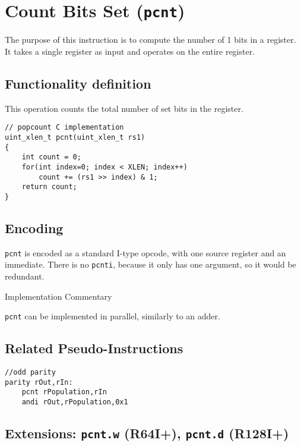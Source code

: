 
\section{Count Bits Set (\texttt{pcnt})}

The purpose of this instruction is to compute the number of 1 bits in a
register. It takes a single register as input and operates on the entire
register.

\subsection{Functionality definition}

This operation counts the total number of set bits in the register.

\begin{verbatim}
// popcount C implementation
uint_xlen_t pcnt(uint_xlen_t rs1)
{
    int count = 0;
    for(int index=0; index < XLEN; index++)
        count += (rs1 >> index) & 1;
    return count;
}
\end{verbatim}

\subsection{Encoding}



\texttt{pcnt} is encoded as a standard I-type opcode, with one source
register and an immediate. There is no \texttt{pcnti}, because it only
has one argument, so it would be redundant.

Implementation Commentary

\texttt{pcnt} can be implemented in parallel, similarly to an adder.

\subsection{Related Pseudo-Instructions}

\begin{verbatim}
//odd parity
parity rOut,rIn:
    pcnt rPopulation,rIn
    andi rOut,rPopulation,0x1
\end{verbatim}

\subsection{Extensions: \texttt{pcnt.w} (R64I+), \texttt{pcnt.d} (R128I+)}

